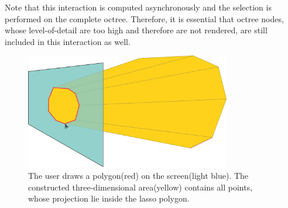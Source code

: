 Note that this interaction is computed asynchronously and the selection is performed on the complete octree. Therefore, it is essential that octree nodes, whose level-of-detail are too high and therefore are not rendered, are still included in this interaction as well. 


\begin{figure}
    \centering
    \includegraphics[width=0.8\textwidth]{System_Design/lasso_sketch.png}%
    \caption[Illustration of the creation of a lasso selection]
		{The user draws a polygon(red) on the screen(light blue). The constructed three-dimensional area(yellow) contains all points, whose projection lie inside the lasso polygon. }
    \label{fig:lasso_sketch}
\end{figure}


